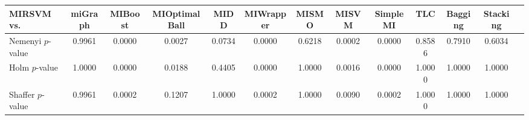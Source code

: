 \begin{threeparttable}
\begin{tabular}{lcccccccccccc}
\toprule
MIRSVM vs. &miGraph &MIBoost &MIOptimalBall &MIDD &MIWrapper &MISMO &MISVM &SimpleMI &TLC &Bagging &Stacking \\
\midrule
Nemenyi $p$-value &0.9961 &0.0000 &0.0027 &0.0734 &0.0000 &0.6218 &0.0002 &0.0000 &0.8586 &0.7910 &0.6034 &  \\
Holm $p$-value &1.0000 &0.0000 &0.0188 &0.4405 &0.0000 &1.0000 &0.0016 &0.0000 &1.0000 &1.0000 &1.0000 &  \\
Shaffer $p$-value &0.9961 &0.0002 &0.1207 &1.0000 &0.0002 &1.0000 &0.0090 &0.0002 &1.0000 &1.0000 &1.0000 &  \\
\bottomrule
\end{tabular}
\end{threeparttable}